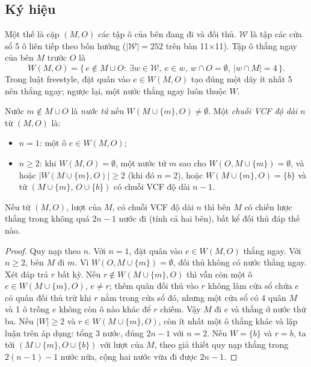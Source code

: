 \subsection{Ký hiệu}
Một thế là cặp $(M,O)$ các tập ô của bên đang đi và đối thủ. $\mathcal W$ là tập các cửa sổ 5 ô liên tiếp theo
bốn hướng ($|\mathcal W|=252$ trên bàn 11$\times$11). Tập ô thắng ngay của bên $M$ trước $O$ là
\begin{equation}
  W(M,O)=\{\,e\notin M\cup O:\ \exists w\in\mathcal W,\ e\in w,\ w\cap O=\emptyset,\ |w\cap M|=4\,\}.
\end{equation}
Trong luật freestyle, đặt quân vào $e\in W(M,O)$ tạo đúng một dãy ít nhất 5 nên thắng ngay; ngược lại, một nước
thắng ngay luôn thuộc $W$.

\begin{dinhnghia}
Nước $m\notin M\cup O$ là \emph{nước tứ} nếu $W(M\cup\{m\},O)\neq\emptyset$. Một \emph{chuỗi VCF độ dài $n$} từ
$(M,O)$ là:
\begin{itemize}
  \item $n=1$: một ô $e\in W(M,O)$;
  \item $n\ge2$: khi $W(M,O)=\emptyset$, một nước tứ $m$ sao cho $W(O,M\cup\{m\})=\emptyset$, và hoặc
  $|W(M\cup\{m\},O)|\ge2$ (khi đó $n=2$), hoặc $W(M\cup\{m\},O)=\{b\}$ và từ $(M\cup\{m\},\,O\cup\{b\})$ có chuỗi
  VCF độ dài $n-1$.
\end{itemize}
\end{dinhnghia}

\begin{dinhly}
\label{dl:cs-vcf}
Nếu từ $(M,O)$, lượt của $M$, có chuỗi VCF độ dài $n$ thì bên $M$ có chiến lược thắng trong không quá $2n-1$ nước
đi (tính cả hai bên), bất kể đối thủ đáp thế nào.
\end{dinhly}
\begin{proof}
Quy nạp theo $n$. Với $n=1$, đặt quân vào $e\in W(M,O)$ thắng ngay. Với $n\ge2$, bên $M$ đi $m$. Vì
$W(O,M\cup\{m\})=\emptyset$, đối thủ không có nước thắng ngay. Xét đáp trả $r$ bất kỳ. Nếu
$r\notin W(M\cup\{m\},O)$ thì vẫn còn một ô $e\in W(M\cup\{m\},O)$, $e\ne r$; thêm quân đối thủ vào $r$ không
làm cửa sổ chứa $e$ có quân đối thủ trừ khi $r$ nằm trong cửa sổ đó, nhưng một cửa sổ có 4 quân $M$ và 1 ô trống
$e$ không còn ô nào khác để $r$ chiếm. Vậy $M$ đi $e$ và thắng ở nước thứ ba. Nếu $|W|\ge2$ và
$r\in W(M\cup\{m\},O)$, còn ít nhất một ô thắng khác và lập luận trên áp dụng: tổng 3 nước, đúng $2n-1$ với $n=2$.
Nếu $W=\{b\}$ và $r=b$, ta tới $(M\cup\{m\},O\cup\{b\})$ với lượt của $M$, theo giả thiết quy nạp thắng trong
$2(n-1)-1$ nước nữa, cộng hai nước vừa đi được $2n-1$.
\end{proof}

